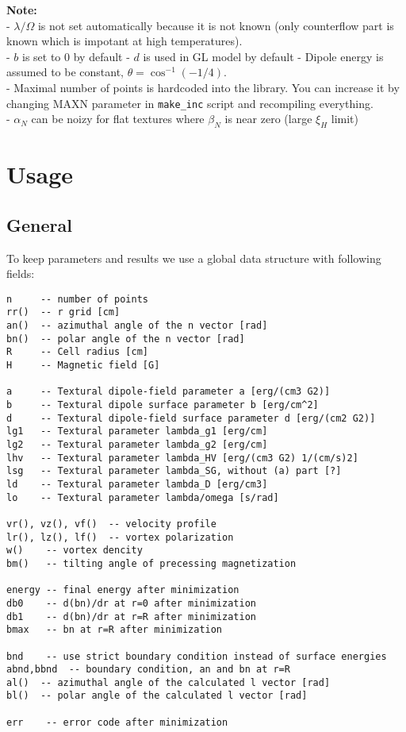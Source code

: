 \documentclass[a4paper]{article}
\begin{document}
{\bf Note:}\\
- $\lambda/\Omega$ is not set automatically because it is not known
  (only counterflow part is known which is impotant at high temperatures).\\
- $b$ is set to 0 by default
- $d$ is used in GL model by default
- Dipole energy is assumed to be constant, $\theta=\cos^{-1}(-1/4)$.\\
- Maximal number of points is hardcoded into the library. You can
  increase it by changing MAXN parameter in {\tt make\_inc} script and
  recompiling everything.\\
- $\alpha_N$ can be noizy for flat textures where $\beta_N$ is near zero
  (large $\xi_H$ limit)\\

\eject
\section*{Usage}

\subsection*{General}
To keep parameters and results we use a global data structure with following fields:

\begin{verbatim}
n     -- number of points
rr()  -- r grid [cm]
an()  -- azimuthal angle of the n vector [rad]
bn()  -- polar angle of the n vector [rad]
R     -- Cell radius [cm]
H     -- Magnetic field [G]

a     -- Textural dipole-field parameter a [erg/(cm3 G2)]
b     -- Textural dipole surface parameter b [erg/cm^2]
d     -- Textural dipole-field surface parameter d [erg/(cm2 G2)]
lg1   -- Textural parameter lambda_g1 [erg/cm]
lg2   -- Textural parameter lambda_g2 [erg/cm]
lhv   -- Textural parameter lambda_HV [erg/(cm3 G2) 1/(cm/s)2]
lsg   -- Textural parameter lambda_SG, without (a) part [?]
ld    -- Textural parameter lambda_D [erg/cm3]
lo    -- Textural parameter lambda/omega [s/rad]

vr(), vz(), vf()  -- velocity profile
lr(), lz(), lf()  -- vortex polarization
w()    -- vortex dencity
bm()   -- tilting angle of precessing magnetization

energy -- final energy after minimization
db0    -- d(bn)/dr at r=0 after minimization
db1    -- d(bn)/dr at r=R after minimization
bmax   -- bn at r=R after minimization

bnd    -- use strict boundary condition instead of surface energies
abnd,bbnd  -- boundary condition, an and bn at r=R
al()  -- azimuthal angle of the calculated l vector [rad]
bl()  -- polar angle of the calculated l vector [rad]

err    -- error code after minimization
\end{verbatim}
\end{document}

